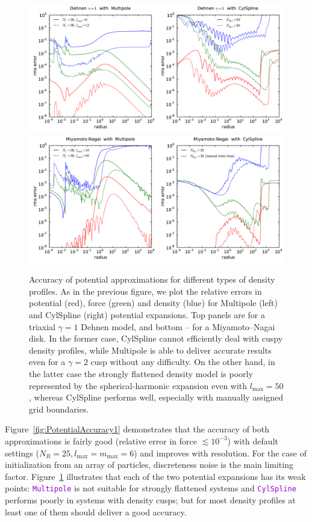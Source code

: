 \documentclass[12pt]{article}
\newcommand{\ttt}[1]{\textcolor{darkviolet}{\texttt{#1}}}
\begin{document}
\begin{figure}
\includegraphics[width=16cm]{D1.pdf}
\includegraphics[width=16cm]{MN.pdf}
\caption{Accuracy of potential approximations for different types of density profiles. As in the previous figure, we plot the relative errors in potential (red), force (green) and density (blue) for Multipole (left) and CylSpline (right) potential expansions. Top panels are for a triaxial $\gamma=1$ Dehnen model, and bottom -- for a Miyamoto--Nagai disk. In the former case, CylSpline cannot efficiently deal with cuspy density profiles, while Multipole is able to deliver accurate results even for a $\gamma=2$ cusp without any difficulty. On the other hand, in the latter case the strongly flattened density model is poorly represented by the spherical-harmonic expansion even with $l_\mathrm{max}=50$, whereas CylSpline performs well, especially with manually assigned grid boundaries.
}  \label{fig:PotentialAccuracy2}
\end{figure}

Figure~\ref{fig:PotentialAccuracy1} demonstrates that the accuracy of both approximations is fairly good (relative error in force $\lesssim 10^{-3}$) with default settings ($N_R=25, l_\mathrm{max}=m_\mathrm{max}=6$) and improves with resolution. For the case of initialization from an array of particles, discreteness noise is the main limiting factor.
Figure~\ref{fig:PotentialAccuracy2} illustrates that each of the two potential expansions has its weak points: \ttt{Multipole} is not suitable for strongly flattened systems and \ttt{CylSpline} performs poorly in systems with density cusps; but for most density profiles at least one of them should deliver a good accuracy.
\end{document}
